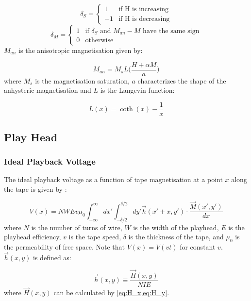 \documentclass[twoside,a4paper]{article}
\begin{document}
\begin{equation}
    \delta_S = \begin{cases}
        1 & \text{if H is increasing} \\
        -1 & \text{if H is decreasing}
    \end{cases}
\end{equation}
\begin{equation}
    \delta_M = \begin{cases}
        1 & \text{if $\delta_S$ and $M_{an} - M$ have the same sign} \\
        0 & \text{otherwise}
    \end{cases}
\end{equation}
%
$M_{an}$ is the anisotropic magnetisation given by:

\begin{equation}
    M_{an} = M_s L \Big( \frac{H + \alpha M}{a} \Big)
\end{equation}
%
where $M_s$ is the magnetisation saturation, $a$ characterizes the shape
of the anhysteric magnetisation and $L$ is the Langevin function:

\begin{equation}
    L(x) = \coth (x) - \frac{1}{x}
\end{equation}

\subsection{Play Head}
\subsubsection{Ideal Playback Voltage}
The ideal playback voltage as a function of tape magnetisation at a point
$x$ along the tape is given by
\cite{1994tmr..book.....B}:

\begin{equation}
    V(x) =  NWEv \mu_0 \int_{-\infty}^{\infty} dx' \int_{-\delta/2}^{\delta/2} dy' \vec{h}(x' + x, y') \cdot \frac{\vec{M}(x', y')}{dx}
    \label{eq:Vx}
\end{equation}
%
where $N$ is the number of turns of wire, $W$ is the width of the playhead, $E$ is the playhead
efficiency, $v$ is the tape speed, $\delta$ is the thickness of the tape,
and $\mu_0$ is the permeability of free space.
Note that $V(x) = V(vt)$ for constant $v$. $\vec{h}(x, y)$ is defined as:

\begin{equation}
    \vec{h} (x, y) \equiv \frac{\vec{H} (x, y)}{NIE}
    \label{eq12}
\end{equation}
%
where $\vec{H} (x, y)$ can be calculated by \cref{eq:H_x,eq:H_y}.
\end{document}
